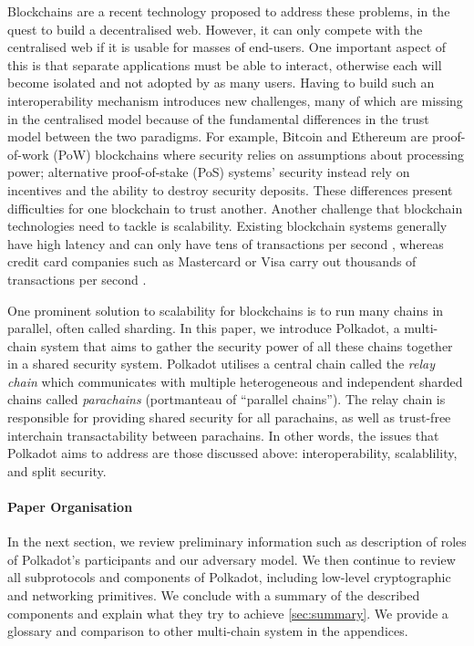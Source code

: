 Blockchains are a recent technology proposed to address these problems, in the quest to build a decentralised web. However, it can only compete with the centralised web if it is usable for masses of end-users. One important aspect of this is that separate applications must be able to interact, otherwise each will become isolated and not adopted by as many users. Having to build such an interoperability mechanism introduces new challenges, many of which are missing in the centralised model because of the fundamental differences in the trust model between the two paradigms.
For example, Bitcoin\cite{nakamoto2008bitcoin} and Ethereum\cite{buterin2014ethereum} are proof-of-work (PoW) blockchains where security relies on assumptions about processing power; alternative proof-of-stake (PoS) systems' security instead rely on incentives and the ability to destroy security deposits. These differences present difficulties for one blockchain to trust another. Another challenge that blockchain technologies need to tackle is scalability. Existing blockchain systems generally have high latency and can only have tens of transactions per second \cite{scaling}, whereas credit card companies such as Mastercard or Visa carry out thousands of transactions per second \cite{Visa2020}.

One prominent solution to scalability for blockchains is to run many chains in parallel, often called sharding. %
In this paper, we introduce Polkadot, a multi-chain system that aims to gather the security power of all these chains together in a shared security system. Polkadot utilises a central chain called the \emph{relay chain} which communicates with multiple heterogeneous and independent sharded chains called \emph{parachains} (portmanteau of “parallel chains”). The relay chain is responsible for providing shared security for all parachains, as well as trust-free interchain transactability between parachains. In other words, the issues that Polkadot aims to address are those discussed above: interoperability, scalablility, and split security.

\paragraph{Paper Organisation} In the next section, we review preliminary information such as description of roles of Polkadot's participants and our adversary model. We then continue to review all subprotocols and components of Polkadot, including low-level cryptographic and networking primitives. We conclude with a summary of the described components and explain what they try to achieve \ref{sec:summary}. We provide a glossary and comparison to other multi-chain system in the appendices.

